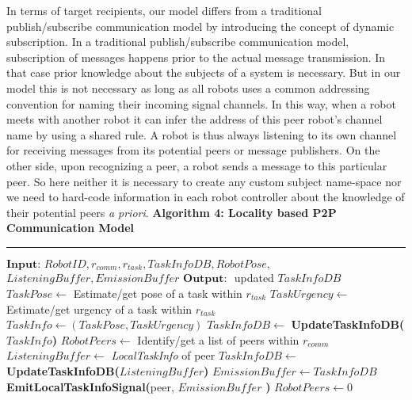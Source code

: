 \documentclass[journal]{IEEEtran}
\newcommand{\HRule}{\rule{\linewidth}{0.3mm}}
\begin{document}
In terms of target recipients, our model differs from a traditional publish/subscribe communication model by introducing the concept of dynamic subscription. In a traditional publish/subscribe communication model, subscription of messages happens prior to the actual message transmission. In that case prior knowledge about the subjects of a system is necessary. But in our model this is not necessary as long as all robots uses a common addressing convention for naming their incoming signal channels. In this way, when a robot meets with another robot it can infer the address of this peer robot's channel name by using a shared rule. A robot is thus always listening to its own channel for receiving messages from its potential peers or message publishers. On the other side, upon recognizing a peer, a robot sends a message to this particular peer. So here neither it is necessary to create any custom subject name-space  \cite{Gerkey+2001} nor we need to hard-code information in each robot controller about the knowledge of their potential peers {\em a priori}. %
%
\textbf{\small Algorithm 4: Locality based P2P Communication Model}
\vspace{-3mm}
\newline
\HRule
\begin{algorithmic}[1]
\label{alg:lpcm}
\State $\textbf{Input: } RobotID, r_{comm}, r_{task}, TaskInfoDB, RobotPose,$\\ \hspace*{1cm}$ListeningBuffer, EmissionBuffer$
\State $\textbf{Output: }$ updated $TaskInfoDB$
\State {}
\State $ TaskPose \gets $ Estimate/get pose of a task within $r_{task}$
\State $ TaskUrgency \gets $ Estimate/get urgency of a task within $r_{task}$
\State $ TaskInfo \gets (TaskPose, TaskUrgency) $ 
\State $TaskInfoDB \gets$
\newline
\textbf{UpdateTaskInfoDB(}$TaskInfo$\textbf{)}
\State {}
\State $ RobotPeers \gets $ Identify/get a list of peers within $r_{comm}$
\State $ListeningBuffer \gets $ \textit{\textit{LocalTaskInfo}} of peer
\State $TaskInfoDB \gets$
\newline 
\textbf{UpdateTaskInfoDB(}$ListeningBuffer$\textbf{)}
\EndIf
\EndFor
\State {}
\State $ EmissionBuffer \gets TaskInfoDB$
\State \textbf{EmitLocalTaskInfoSignal(}peer, $EmissionBuffer$ \textbf{) }
\EndFor
\State $RobotPeers \gets 0$
\end{algorithmic}
\end{document}
